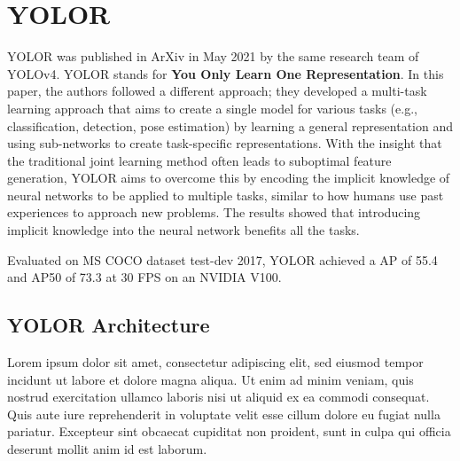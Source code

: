 \documentclass{article}
\begin{document}


\section{YOLOR}



YOLOR \cite{wang2021you} was published in ArXiv in May 2021 by the same research team of YOLOv4. YOLOR stands for \textbf{You Only Learn One Representation}. In this paper, the authors followed a different approach; they developed a multi-task learning approach that aims to create a single model for various tasks (e.g., classification, detection, pose estimation) by learning a general representation and using sub-networks to create task-specific representations. With the insight that the traditional joint learning method often leads to suboptimal feature generation, YOLOR aims to overcome this by encoding the implicit knowledge of neural networks to be applied to multiple tasks, similar to how humans use past experiences to approach new problems. The results showed that introducing implicit knowledge into the neural network benefits all the tasks.

Evaluated on MS COCO dataset test-dev 2017, YOLOR achieved a AP of 55.4 and AP50 of 73.3 at 30 FPS on an NVIDIA V100.

\subsection{YOLOR Architecture}


Lorem ipsum dolor sit amet, consectetur adipiscing elit, sed eiusmod tempor incidunt ut labore et dolore magna aliqua. Ut enim ad minim veniam, quis nostrud exercitation ullamco laboris nisi ut aliquid ex ea commodi consequat. Quis aute iure reprehenderit in voluptate velit esse cillum dolore eu fugiat nulla pariatur. Excepteur sint obcaecat cupiditat non proident, sunt in culpa qui officia deserunt mollit anim id est laborum.
\end{document}
